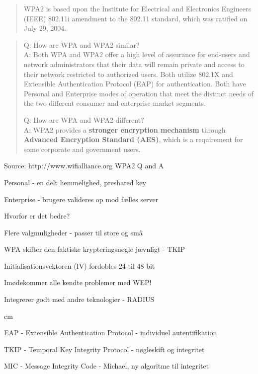 \documentclass[20pt,landscape,a4paper,footrule]{foils}
\begin{document}

\begin{quote}
WPA2 is based upon the Institute for Electrical and Electronics
Engineers (IEEE) 802.11i amendment to the 802.11 standard, which was
ratified on July 29, 2004.
\end{quote}

\begin{quote}
Q: How are WPA and WPA2 similar?\\
A: Both WPA and WPA2 offer a high level of assurance for end-users and network
administrators that their data will remain private and access to their
network restricted to authorized users.
Both utilize 802.1X and Extensible Authentication Protocol (EAP) for
authentication. Both have Personal and Enterprise modes of operation
that meet the distinct needs of the two different consumer and
enterprise market segments.

Q: How are WPA and WPA2 different?\\
A: WPA2 provides a {\bf stronger encryption mechanism} through {\bf
  Advanced Encryption Standard (AES)}, which is a requirement for some
corporate and government users.
\end{quote}

\centerline{Source: http://www.wifialliance.org WPA2 Q and A}


\begin{list1}
\item Personal - en delt hemmelighed, preshared key
\item Enterprise - brugere valideres op mod fælles server
\item Hvorfor er det bedre?
\begin{list2}
\item Flere valgmuligheder - passer til store og små
\item WPA skifter den faktiske krypteringsnøgle jævnligt - TKIP
\item Initialisationsvektoren (IV) fordobles 24 til 48 bit
\item Imødekommer alle kendte problemer med WEP!
\item Integrerer godt med andre teknologier - RADIUS

 cm
\item EAP - Extensible Authentication Protocol - individuel autentifikation
\item TKIP - Temporal Key Integrity Protocol - nøgleskift og integritet
\item MIC - Message Integrity Code - Michael, ny algoritme til integritet
\end{list2}

\end{list1}
\end{document}

